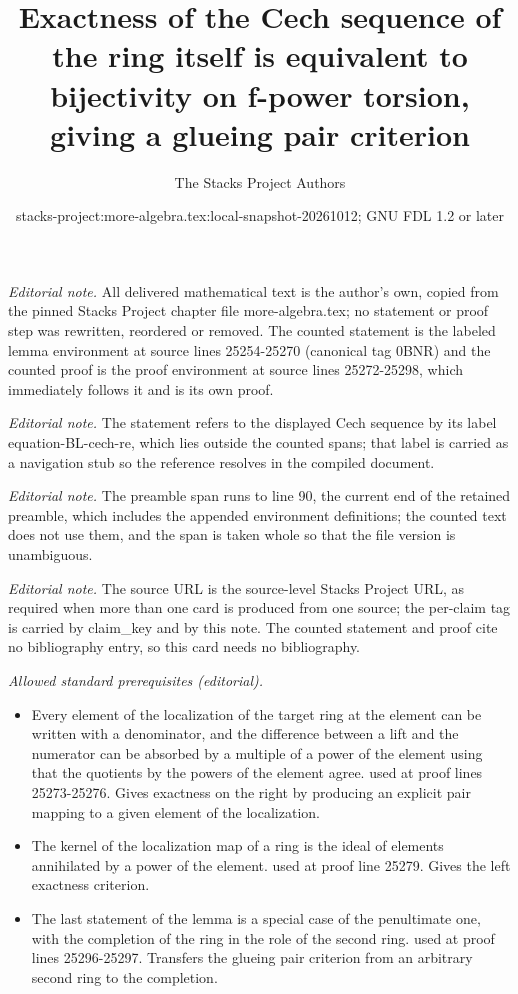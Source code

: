 \documentclass[10pt,a4paper]{amsart}
\title{Exactness of the Cech sequence of the ring itself is equivalent to bijectivity on f-power torsion, giving a glueing pair criterion}
\author{The Stacks Project Authors}
\date{stacks-project:more-algebra.tex:local-snapshot-20261012; GNU FDL 1.2 or later}
\theoremstyle{plain}
\theoremstyle{definition}
\theoremstyle{remark}
\numberwithin{equation}{subsection}
\begin{document}
\maketitle
\setcounter{subsection}{1}
\noindent\textit{Editorial note.} All delivered mathematical text is the author's own, copied from the pinned Stacks Project chapter file more-algebra.tex; no statement or proof step was rewritten, reordered or removed. The counted statement is the labeled lemma environment at source lines 25254-25270 (canonical tag 0BNR) and the counted proof is the proof environment at source lines 25272-25298, which immediately follows it and is its own proof.\par\medskip
\noindent\textit{Editorial note.} The statement refers to the displayed Cech sequence by its label equation-BL-cech-re, which lies outside the counted spans; that label is carried as a navigation stub so the reference resolves in the compiled document.\par\medskip
\noindent\textit{Editorial note.} The preamble span runs to line 90, the current end of the retained preamble, which includes the appended environment definitions; the counted text does not use them, and the span is taken whole so that the file version is unambiguous.\par\medskip
\noindent\textit{Editorial note.} The source URL is the source-level Stacks Project URL, as required when more than one card is produced from one source; the per-claim tag is carried by claim\_key and by this note. The counted statement and proof cite no bibliography entry, so this card needs no bibliography.\par\medskip
\noindent\textit{Allowed standard prerequisites (editorial).}\begin{itemize}
\item Every element of the localization of the target ring at the element can be written with a denominator, and the difference between a lift and the numerator can be absorbed by a multiple of a power of the element using that the quotients by the powers of the element agree. used at proof lines 25273-25276. Gives exactness on the right by producing an explicit pair mapping to a given element of the localization.
\item The kernel of the localization map of a ring is the ideal of elements annihilated by a power of the element. used at proof line 25279. Gives the left exactness criterion.
\item The last statement of the lemma is a special case of the penultimate one, with the completion of the ring in the role of the second ring. used at proof lines 25296-25297. Transfers the glueing pair criterion from an arbitrary second ring to the completion.
\end{itemize}\medskip
\end{document}
